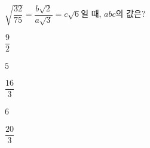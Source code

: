 $\sqrt{\dfrac{32}{75}}=\dfrac{b\sqrt{2}}{a\sqrt{3}}=c\sqrt{6}$일 때, $abc$의 값은? 
\begin{choices32}{\rule[-3ex]{0pt}{8ex}$\dfrac{9}{2}$}{\rule[-3ex]{0pt}{8ex}$5$}{\rule[-3ex]{0pt}{8ex}$\dfrac{16}{3}$}{\rule[-3ex]{0pt}{8ex}$6$}{\rule[-3ex]{0pt}{8ex}$\dfrac{20}{3}$}\end{choices32}
